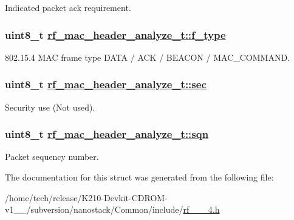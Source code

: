 Indicated packet ack requirement. \hypertarget{structrf__mac__header__analyze__t_cdea55dd9662076c530db418e501a4b3}{
\subsubsection[f\_\-type]{\setlength{\rightskip}{0pt plus 5cm}uint8\_\-t \hyperlink{structrf__mac__header__analyze__t_cdea55dd9662076c530db418e501a4b3}{rf\_\-mac\_\-header\_\-analyze\_\-t::f\_\-type}}}
\label{structrf__mac__header__analyze__t_cdea55dd9662076c530db418e501a4b3}


802.15.4 MAC frame type DATA / ACK / BEACON / MAC\_\-COMMAND. \hypertarget{structrf__mac__header__analyze__t_101f756d24f219d91e70d6f2f402e0d3}{
\subsubsection[sec]{\setlength{\rightskip}{0pt plus 5cm}uint8\_\-t \hyperlink{structrf__mac__header__analyze__t_101f756d24f219d91e70d6f2f402e0d3}{rf\_\-mac\_\-header\_\-analyze\_\-t::sec}}}
\label{structrf__mac__header__analyze__t_101f756d24f219d91e70d6f2f402e0d3}


Security use (Not used). \hypertarget{structrf__mac__header__analyze__t_9697d7e7a2305dccac3af80253c02894}{
\subsubsection[sqn]{\setlength{\rightskip}{0pt plus 5cm}uint8\_\-t \hyperlink{structrf__mac__header__analyze__t_9697d7e7a2305dccac3af80253c02894}{rf\_\-mac\_\-header\_\-analyze\_\-t::sqn}}}
\label{structrf__mac__header__analyze__t_9697d7e7a2305dccac3af80253c02894}


Packet sequency number. 

The documentation for this struct was generated from the following file:\begin{CompactItemize}
\item 
/home/tech/release/K210-Devkit-CDROM-v1\_\_/subversion/nanostack/Common/include/\hyperlink{rf__802__15__4_8h}{rf\_\_\_\-4.h}\end{CompactItemize}
